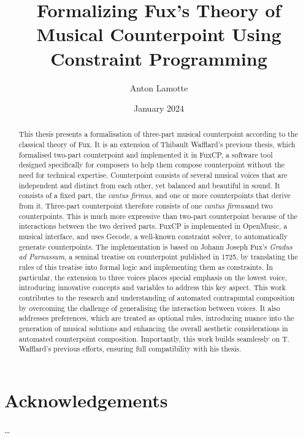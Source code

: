 \documentclass[11pt,table,xcdraw]{report}
\title{Formalizing Fux's Theory of Musical Counterpoint Using Constraint Programming}
\author{Anton Lamotte}
\date{January 2024}
\newcommand{\gap}{\textit{Gradus ad Parnassum}}
\newcommand{\cf}{\textit{cantus firmus}}
\begin{document}

\null
\thispagestyle{empty}
\addtocounter{page}{-1}
\newpage
{}
\begin{abstract}
    \large{
        This thesis presents a formalisation of three-part musical counterpoint according to the classical theory of Fux. It is an extension of Thibault Wafflard's previous thesis, which formalised two-part counterpoint and implemented it in FuxCP, a software tool designed specifically for composers to help them compose counterpoint without the need for technical expertise. Counterpoint consists of several musical voices that are independent and distinct from each other, yet balanced and beautiful in sound. It consists of a fixed part, the \cf, and one or more counterpoints that derive from it. Three-part counterpoint therefore consists of one \cf and two counterpoints. This is much more expressive than two-part counterpoint because of the interactions between the two derived parts.
        FuxCP is implemented in OpenMusic, a musical interface, and uses Gecode, a well-known constraint solver, to automatically generate counterpoints. The implementation is based on Johann Joseph Fux's \gap, a seminal treatise on counterpoint published in 1725, by translating the rules of this treatise into formal logic and implementing them as constraints. In particular, the extension to three voices places special emphasis on the lowest voice, introducing innovative concepts and variables to address this key aspect.
        This work contributes to the research and understanding of automated contrapuntal composition by overcoming the challenge of generalising the interaction between voices. It also addresses preferences, which are treated as optional rules, introducing nuance into the generation of musical solutions and enhancing the overall aesthetic considerations in automated counterpoint composition. Importantly, this work builds seamlessly on T. Wafflard's previous efforts, ensuring full compatibility with his thesis.   }
\end{abstract}

\chapter*{Acknowledgements}
\dots
\restoregeometry 
\end{document}
